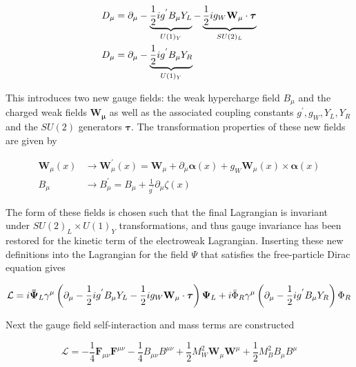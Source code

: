 \begin{align} 
\label{eq:gsw:left} 
D_\mu &= \partial_{\mu}
- \underbrace{\frac{1}{2}ig^{'}B_{\mu}Y_{L}}_{U(1)_Y} -
  \underbrace{\frac{1}{2}ig_{W}\bf{W}_\mu \cdot \boldsymbol{\tau}}_{SU(2)_L} \\
\label{eq:gsw:right} 
D_\mu &= \partial_{\mu}  - \underbrace{\frac{1}{2}ig^{'}B_{\mu}Y_{R}}_{U(1)_Y} 
\end{align}

This introduces two new gauge fields: the weak hypercharge field $B_\mu$ and
the charged weak fields $\boldsymbol{W_\mu}$ as well as the associated coupling
constants $g^{'}, g_{W}, Y_{L}, Y_{R}$ and the $SU(2)$ generators
$\boldsymbol{\tau}$.  The transformation properties of these new fields are
given by

\begin{align}
\boldsymbol{W}_{\mu}(x) &\rightarrow \boldsymbol{W}_{\mu}^{'}(x) =
\boldsymbol{W}_{\mu} + \partial_{\mu} \boldsymbol{\alpha}(x) +
g_{W}\boldsymbol{W}_{\mu}(x) \times \boldsymbol{\alpha}(x)
\\ 
B_{\mu} &\rightarrow B_{\mu}^{'} = B_{\mu} +
\frac{1}{g^{'}}\partial_{\mu}\zeta(x)
\end{align}

The form of these fields is chosen such that the final Lagrangian is invariant
under $SU(2)_L \times U(1)_Y$ transformations, and thus gauge invariance has
been restored for the kinetic term of the electroweak Lagrangian.  Inserting
these new definitions into the Lagrangian for the field $\Psi$ that satisfies
the free-particle Dirac equation gives

\begin{equation} \label{eq:gsw:fermion_lagrangian}
\mathcal{L} = i\boldsymbol{\bar{\Psi}}_{L}\gamma^{\mu} \left( \partial_{\mu}
- \frac{1}{2}ig^{'}B_{\mu}Y_{L} - \frac{1}{2}ig_{W}\bf{W}_\mu \cdot
  \boldsymbol{\tau} \right) \boldsymbol{\Psi}_{L} + i \bar{\Phi}_{R}\gamma^{\mu}
\left(\partial_{\mu} - \frac{1}{2}ig^{'}B_{\mu}Y_{R} \right) \Phi_{R}
\end{equation}

Next the gauge field self-interaction and mass terms are constructed

\begin{equation} \label{eq:gsw:gauge_lagrangian}
\mathcal{L} = -\frac{1}{4}\boldsymbol{F}_{\mu\nu}\boldsymbol{F}^{\mu\nu}
-\frac{1}{4}B_{\mu\nu}B^{\mu\nu} +
\frac{1}{2}M_{W}^{2}\boldsymbol{W}_{\mu}\boldsymbol{W}^{\mu} +
\frac{1}{2}M_{B}^{2}B_{\mu}B^{\mu}
\end{equation}


